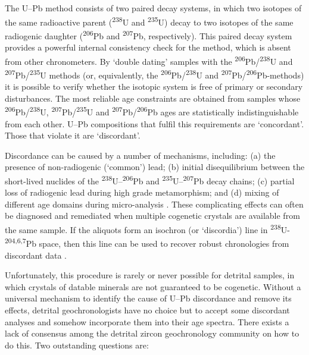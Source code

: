 \documentclass[gchron, manuscript]{copernicus}
\begin{document}


\introduction  %
\label{sec:intro}

The U--Pb method consists of two paired decay systems, in which two
isotopes of the same radioactive parent (\textsuperscript{238}U and
\textsuperscript{235}U) decay to two isotopes of the same radiogenic
daughter (\textsuperscript{206}Pb and \textsuperscript{207}Pb,
respectively). This paired decay system provides a powerful internal
consistency check for the method, which is absent from other
chronometers. By `double dating' samples with the
\textsuperscript{206}Pb/\textsuperscript{238}U and
\textsuperscript{207}Pb/\textsuperscript{235}U methods (or,
equivalently, the \textsuperscript{206}Pb/\textsuperscript{238}U and
\textsuperscript{207}Pb/\textsuperscript{206}Pb-methods) it is
possible to verify whether the isotopic system is free of primary or
secondary disturbances. The most reliable age constraints are obtained
from samples whose \textsuperscript{206}Pb/\textsuperscript{238}U,
\textsuperscript{207}Pb/\textsuperscript{235}U and
\textsuperscript{207}Pb/\textsuperscript{206}Pb ages are statistically
indistinguishable from each other. U--Pb compositions that fulfil this
requirements are `concordant'. Those that violate it are `discordant'.

Discordance can be caused by a number of mechanisms, including: (a)
the presence of non-radiogenic (`common') lead; (b) initial
disequilibrium between the short-lived nuclides of the
\textsuperscript{238}U--\textsuperscript{206}Pb and
\textsuperscript{235}U--\textsuperscript{207}Pb decay chains; (c)
partial loss of radiogenic lead during high grade metamorphism; and
(d) mixing of different age domains during micro-analysis
\citep{schoene2014}. These complicating effects can often be diagnosed
and remediated when multiple cogenetic crystals are available from the
same sample. If the aliquots form an isochron (or `discordia') line in
\textsuperscript{238}U-\textsuperscript{204,6,7}Pb space, then this
line can be used to recover robust chronologies from discordant data
\citep{ludwig1998}.

Unfortunately, this procedure is rarely or never possible for detrital
samples, in which crystals of datable minerals are not guaranteed to
be cogenetic.  Without a universal mechanism to identify the cause of
U--Pb discordance and remove its effects, detrital geochronologists
have no choice but to accept some discordant analyses and somehow
incorporate them into their age spectra.  There exists a lack of
consensus among the detrital zircon geochronology community on how to
do this.  Two outstanding questions are:
\end{document}
